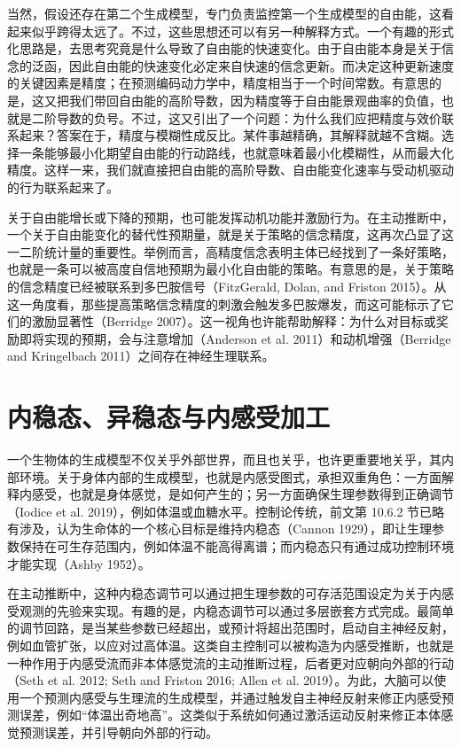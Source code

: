 当然，假设还存在第二个生成模型，专门负责监控第一个生成模型的自由能，这看起来似乎跨得太远了。不过，这些思想还可以有另一种解释方式。一个有趣的形式化思路是，去思考究竟是什么导致了自由能的快速变化。由于自由能本身是关于信念的泛函，因此自由能的快速变化必定来自快速的信念更新。而决定这种更新速度的关键因素是精度；在预测编码动力学中，精度相当于一个时间常数。有意思的是，这又把我们带回自由能的高阶导数，因为精度等于自由能景观曲率的负值，也就是二阶导数的负号。不过，这又引出了一个问题：为什么我们应把精度与效价联系起来？答案在于，精度与模糊性成反比。某件事越精确，其解释就越不含糊。选择一条能够最小化期望自由能的行动路线，也就意味着最小化模糊性，从而最大化精度。这样一来，我们就直接把自由能的高阶导数、自由能变化速率与受动机驱动的行为联系起来了。

关于自由能增长或下降的预期，也可能发挥动机功能并激励行为。在主动推断中，一个关于自由能变化的替代性预期量，就是关于策略的信念精度，这再次凸显了这一二阶统计量的重要性。举例而言，高精度信念表明主体已经找到了一条好策略，也就是一条可以被高度自信地预期为最小化自由能的策略。有意思的是，关于策略的信念精度已经被联系到多巴胺信号（FitzGerald, Dolan, and Friston 2015）。从这一角度看，那些提高策略信念精度的刺激会触发多巴胺爆发，而这可能标示了它们的激励显著性（Berridge 2007）。这一视角也许能帮助解释：为什么对目标或奖励即将实现的预期，会与注意增加（Anderson et al. 2011）和动机增强（Berridge and Kringelbach 2011）之间存在神经生理联系。

\section{内稳态、异稳态与内感受加工}

一个生物体的生成模型不仅关乎外部世界，而且也关乎，也许更重要地关乎，其内部环境。关于身体内部的生成模型，也就是内感受图式，承担双重角色：一方面解释内感受，也就是身体感觉，是如何产生的；另一方面确保生理参数得到正确调节（Iodice et al. 2019），例如体温或血糖水平。控制论传统，前文第 10.6.2 节已略有涉及，认为生命体的一个核心目标是维持内稳态（Cannon 1929），即让生理参数保持在可生存范围内，例如体温不能高得离谱；而内稳态只有通过成功控制环境才能实现（Ashby 1952）。

在主动推断中，这种内稳态调节可以通过把生理参数的可存活范围设定为关于内感受观测的先验来实现。有趣的是，内稳态调节可以通过多层嵌套方式完成。最简单的调节回路，是当某些参数已经超出，或预计将超出范围时，启动自主神经反射，例如血管扩张，以应对过高体温。这类自主控制可以被构造为内感受推断，也就是一种作用于内感受流而非本体感觉流的主动推断过程，后者更对应朝向外部的行动（Seth et al. 2012; Seth and Friston 2016; Allen et al. 2019）。为此，大脑可以使用一个预测内感受与生理流的生成模型，并通过触发自主神经反射来修正内感受预测误差，例如“体温出奇地高”。这类似于系统如何通过激活运动反射来修正本体感觉预测误差，并引导朝向外部的行动。

